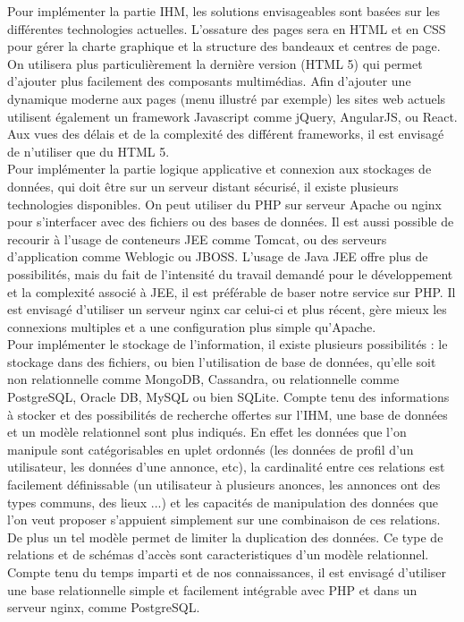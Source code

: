 \documentclass[a4paper,11pt]{article}
\begin{document}
Pour implémenter la partie IHM, les solutions envisageables sont basées sur les différentes
technologies actuelles.
L’ossature des pages sera en HTML et en CSS pour gérer la charte graphique et la structure des
bandeaux et centres de page. On utilisera plus particulièrement la dernière version (HTML 5) qui permet
d’ajouter plus facilement des composants multimédias. Afin d’ajouter une dynamique moderne aux
pages (menu illustré par exemple) les sites web actuels utilisent également un framework Javascript
comme jQuery, AngularJS, ou React. Aux vues des délais et de la complexité des différent frameworks,
il est envisagé de n’utiliser que du HTML 5.\\

Pour implémenter la partie logique applicative et connexion aux stockages de données, qui doit être
sur un serveur distant sécurisé, il existe plusieurs technologies disponibles. On peut utiliser du PHP sur
serveur Apache ou nginx pour s’interfacer avec des fichiers ou des bases de données. Il est aussi possible de
recourir à l’usage de conteneurs JEE comme Tomcat, ou des serveurs d’application comme Weblogic
ou JBOSS. L’usage de Java JEE offre plus de possibilités, mais du fait de l’intensité du travail demandé
pour le développement et la complexité associé à JEE, il est préférable de baser notre service sur PHP.
Il est envisagé d'utiliser un serveur nginx car celui-ci et plus récent, gère mieux les connexions
multiples et a une configuration plus simple qu'Apache.\\

Pour implémenter le stockage de l’information, il existe plusieurs possibilités : le stockage dans des
fichiers, ou bien l’utilisation de base de données, qu’elle soit non relationnelle comme MongoDB,
Cassandra, ou relationnelle comme PostgreSQL, Oracle DB, MySQL ou bien SQLite. Compte tenu des
informations à stocker et des possibilités de recherche offertes sur l’IHM, une base de données et un
modèle relationnel sont plus indiqués. En effet les données que l'on manipule sont catégorisables
en uplet ordonnés (les données de profil d'un utilisateur, les données d'une annonce, etc), la
cardinalité entre ces relations est facilement définissable (un utilisateur à plusieurs anonces, les
annonces ont des types communs, des lieux ...) et les capacités de manipulation des données que l'on
veut proposer s'appuient simplement sur une combinaison de ces relations. De plus un tel modèle permet de
limiter la duplication des données. Ce type de relations et de schémas d'accès sont caracteristiques
d'un modèle relationnel. Compte tenu du temps imparti et de nos connaissances,
il est envisagé d’utiliser une base relationnelle simple et facilement intégrable avec PHP et
dans un serveur nginx, comme PostgreSQL.\\
\end{document}
